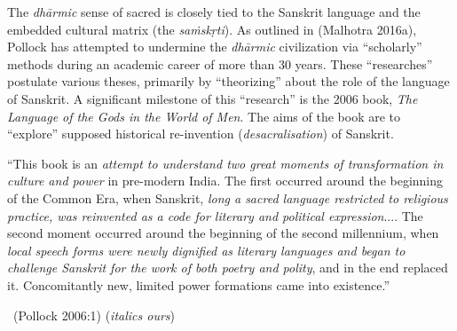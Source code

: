 The \textit{dhārmic} sense of sacred is closely tied to the Sanskrit language and the embedded cultural matrix (the \textit{saṁskṛti}). As outlined in (Malhotra 2016a), Pollock has attempted to undermine the \textit{dhārmic} civilization via “scholarly” methods during an academic career of more than 30 years. These “researches” postulate various theses, primarily by “theorizing” about the role of the language of Sanskrit. A significant milestone of this “research” is the 2006 book, \textit{The Language of the Gods in the World of Men}. The aims of the book are to “explore” supposed historical re-invention (\textit{desacralisation}) of Sanskrit.

\begin{myquote}
“This book is an \textit{attempt to understand two great moments of transformation in culture and power} in pre-modern India. The first occurred around the beginning of the Common Era, when Sanskrit, \textit{long a sacred language restricted to religious practice, was reinvented as a code for literary and political expression}.... The second moment occurred around the beginning of the second millennium, when \textit{local speech forms were newly dignified as literary languages and began to challenge Sanskrit for the work of both poetry and polity}, and in the end replaced it. Concomitantly new, limited power formations came into existence.” 

~\hfill (Pollock 2006:1) (\textit{italics ours})
\end{myquote}

